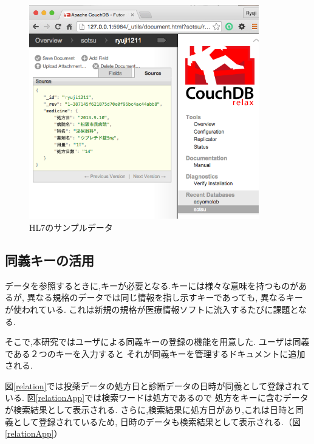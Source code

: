 			\begin{figure}[htbp]
				\begin{center}
					\includegraphics[width=10cm, bb=0 0 576 573]{./gazou/hl7-data.png}
				\end{center}
				\caption{HL7のサンプルデータ}
				\label{hl7-data}
			\end{figure}



\subsection{同義キーの活用}
	データを参照するときに,キーが必要となる.キーには様々な意味を持つものがあるが,
	異なる規格のデータでは同じ情報を指し示すキーであっても,
	異なるキーが使われている.
	これは新規の規格が医療情報ソフトに流入するたびに課題となる.

	そこで,本研究ではユーザによる同義キーの登録の機能を用意した.
	ユーザは同義である２つのキーを入力すると
	それが同義キーを管理するドキュメントに追加される.

	図\ref{relation}では投薬データの処方日と診断データの日時が同義として登録されている.
	図\ref{relationApp}では検索ワードは処方であるので
	処方をキーに含むデータが検索結果として表示される.
	さらに,検索結果に処方日があり,これは日時と同義として登録されているため,
	日時のデータも検索結果として表示される.（図\ref{relationApp}）


